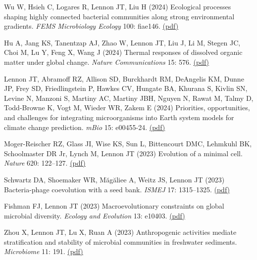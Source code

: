 \documentclass[11pt]{article}
\begin{document}
\begin{etaremune}
\item Wu W, Hsieh C, Logares R, Lennon JT, Liu H (2024) Ecological processes shaping highly connected bacterial communities along strong environmental gradients. \textit{FEMS Microbiology Ecology} 100: fiae146. \href{https://lennonlab.github.io/assets/publications/Wu_etal_2024.pdf}{(pdf)}

\item Hu A, Jang KS, Tanentzap AJ, Zhao W, Lennon JT, Liu J, Li M, Stegen JC, Choi M, Lu Y, Feng X, Wang J (2024) Thermal responses of dissolved organic matter under global change. \textit{Nature Communications} 15: 576. \href{https://lennonlab.github.io/assets/publications/Hu_etal_2024.pdf}{(pdf)}

\item Lennon JT, Abramoff RZ, Allison SD, Burckhardt RM, DeAngelis KM, Dunne JP, Frey SD, Friedlingstein P, Hawkes CV, Hungate BA, Khurana S, Kivlin SN, Levine N, Manzoni S, Martiny AC, Martiny JBH, Nguyen N, Rawat M, Talmy D, Todd-Browne K, Vogt M, Wieder WR, Zakem E (2024) Priorities, opportunities, and challenges for integrating microorganisms into Earth system models for climate change prediction. \textit{mBio} 15: e00455-24. \href{https://lennonlab.github.io/assets/publications/Lennon_etal_2024.pdf}{(pdf)}

\item Moger-Reischer RZ, Glass JI, Wise KS, Sun L, Bittencourt DMC, Lehmkuhl BK, Schoolmaster DR Jr, Lynch M, Lennon JT (2023) Evolution of a minimal cell. \textit{Nature} 620: 122--127. \href{https://lennonlab.github.io/assets/publications/Moger-Reischer_etal_2023.pdf}{(pdf)}

\item Schwartz DA, Shoemaker WR, Măgăliee A, Weitz JS, Lennon JT (2023) Bacteria-phage coevolution with a seed bank. \textit{ISMEJ} 17: 1315–1325. \href{https://lennonlab.github.io/assets/publications/Schwartz_etal_2023b.pdf}{(pdf)}

\item Fishman FJ, Lennon JT (2023) Macroevolutionary constraints on global microbial diversity. \textit{Ecology and Evolution} 13: e10403. \href{https://lennonlab.github.io/assets/publications/Fishman_Lennon_2023.pdf}{(pdf)}

\item Zhou X, Lennon JT, Lu X, Ruan A (2023) Anthropogenic activities mediate stratification and stability of microbial communities in freshwater sediments. \textit{Microbiome} 11: 191. \href{https://lennonlab.github.io/assets/publications/Zhou_etal_2023.pdf}{(pdf)}


\end{etaremune}
\end{document}
